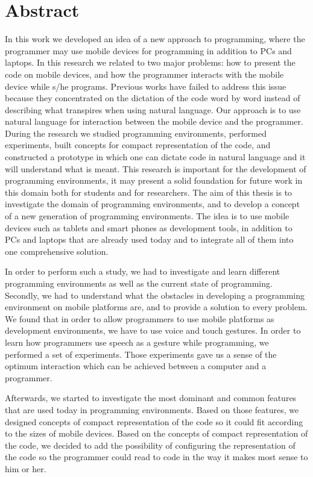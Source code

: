 \section*{Abstract}
In this work we developed an idea of a new approach to programming, where the programmer may use mobile devices for programming in addition to PCs and laptops. In this research we related to two major problems: how to present the code on mobile devices, and how the programmer interacts with the mobile device while s/he programs. Previous works have failed to address this issue because they concentrated on the dictation of the code word by word instead of describing what transpires when using natural language. Our approach is to use natural language for interaction between the mobile device and the programmer. During the research we studied programming environments, performed experiments, built concepts for compact representation of the code, and constructed a prototype in which one can dictate code in natural language and it will understand what is meant. This research is important for the development of programming environments, it may present a solid foundation for future work in this domain both for students and for researchers.
The aim of this thesis is to investigate the domain of programming environments, and to develop a concept of a new generation of programming environments. The idea is to use mobile devices such as tablets and smart phones as development tools, in addition to PCs and laptops that are already used today and to integrate all of them into one comprehensive solution.

In order to perform such a study, we had to investigate and learn different programming environments as well as the current state of programming. Secondly, we had to understand what the obstacles in developing a programming environment on mobile platforms are, and to provide a solution to every problem. We found that in order to allow programmers to use mobile platforms as development environments, we have to use voice and touch gestures. In order to learn how programmers use speech as a gesture while programming, we performed a set of experiments. Those experiments gave us a sense of the optimum interaction which can be achieved between a computer and a programmer.

Afterwards, we started to investigate the most dominant and common features that are used today in programming environments. Based on those features, we designed concepts of compact representation of the code so it could fit according to the sizes of mobile devices. Based on the concepts of compact representation of the code, we decided to add the possibility of configuring the representation of the code so the programmer could read to code in the way it makes most sense to him or her.

